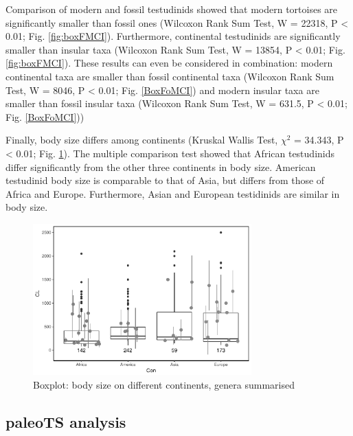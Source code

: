 Comparison of modern and fossil testudinids showed that modern tortoises are significantly smaller than fossil ones (Wilcoxon Rank Sum Test, W = 22318, P < 0.01; Fig. \ref{fig:boxFMCI}). Furthermore, continental testudinids are significantly smaller than insular taxa (Wilcoxon Rank Sum Test, W = 13854, P < 0.01; Fig. \ref{fig:boxFMCI}).
These results can even be considered in combination: modern continental taxa are smaller than fossil continental taxa (Wilcoxon Rank Sum Test, W = 8046, P < 0.01; Fig. \ref{BoxFoMCI}) and modern insular taxa are smaller than fossil insular taxa (Wilcoxon Rank Sum Test, W = 631.5, P < 0.01; Fig. \ref{BoxFoMCI}))

Finally, body size differs among continents (Kruskal Wallis Test, $\chi^2$ = 34.343, P < 0.01; Fig. \ref{fig:boxCon}). The multiple comparison test showed that African testudinids differ significantly from the other three continents in body size. American testudinid body size is comparable to that of Asia, but differs from those of Africa and Europe. Furthermore, Asian and European testidinids are similar in body size. %


\begin{figure}[htbp]
	\centering
	\includegraphics[width=0.75\textwidth]{MA_JJ_files/figure-latex/BPCon-1.pdf}
	\caption{Boxplot: body size on different continents, genera summarised}
	\label{fig:boxCon}
\end{figure}



\FloatBarrier

\subsection{paleoTS analysis}\label{paleots-analysis}




